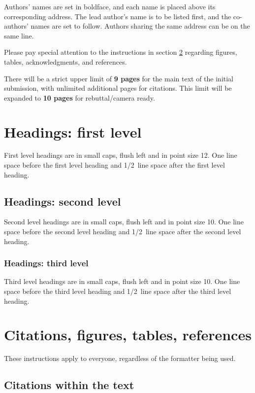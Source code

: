 \documentclass{article} %
\begin{document}
Authors' names are
set in boldface, and each name is placed above its corresponding
address. The lead author's name is to be listed first, and
the co-authors' names are set to follow. Authors sharing the
same address can be on the same line.

Please pay special attention to the instructions in section \ref{others}
regarding figures, tables, acknowledgments, and references.


There will be a strict upper limit of \textbf{9 pages} for the main text of the initial submission, with unlimited additional pages for citations. This limit will be expanded to \textbf{10 pages} for rebuttal/camera ready.

\section{Headings: first level}
\label{headings}

First level headings are in small caps,
flush left and in point size 12. One line space before the first level
heading and 1/2~line space after the first level heading.

\subsection{Headings: second level}

Second level headings are in small caps,
flush left and in point size 10. One line space before the second level
heading and 1/2~line space after the second level heading.

\subsubsection{Headings: third level}

Third level headings are in small caps,
flush left and in point size 10. One line space before the third level
heading and 1/2~line space after the third level heading.

\section{Citations, figures, tables, references}
\label{others}

These instructions apply to everyone, regardless of the formatter being used.

\subsection{Citations within the text}
\end{document}
